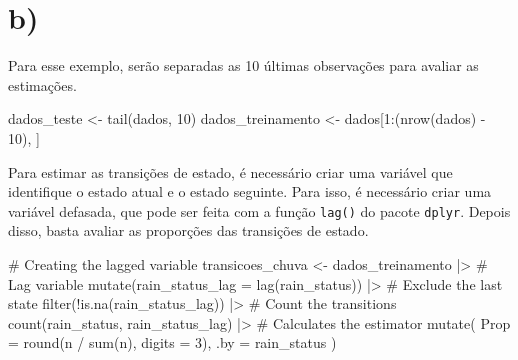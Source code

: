 \documentclass[
  letterpaper,
  DIV=11,
  numbers=noendperiod]{scrreprt}
\newenvironment{Shaded}{\begin{snugshade}}{\end{snugshade}}
\newcommand{\AttributeTok}[1]{\textcolor[rgb]{0.40,0.45,0.13}{#1}}
\newcommand{\CommentTok}[1]{\textcolor[rgb]{0.37,0.37,0.37}{#1}}
\newcommand{\DecValTok}[1]{\textcolor[rgb]{0.68,0.00,0.00}{#1}}
\newcommand{\FunctionTok}[1]{\textcolor[rgb]{0.28,0.35,0.67}{#1}}
\newcommand{\NormalTok}[1]{\textcolor[rgb]{0.00,0.23,0.31}{#1}}
\newcommand{\OtherTok}[1]{\textcolor[rgb]{0.00,0.23,0.31}{#1}}
\newcommand{\SpecialCharTok}[1]{\textcolor[rgb]{0.37,0.37,0.37}{#1}}
\begin{document}
\hypertarget{b}{%
\section*{b)}\label{b}}


Para esse exemplo, serão separadas as 10 últimas observações para
avaliar as estimações.

\begin{Shaded}
\begin{Highlighting}[]
\NormalTok{dados\_teste }\OtherTok{\textless{}{-}} \FunctionTok{tail}\NormalTok{(dados, }\DecValTok{10}\NormalTok{)}
\NormalTok{dados\_treinamento }\OtherTok{\textless{}{-}}\NormalTok{ dados[}\DecValTok{1}\SpecialCharTok{:}\NormalTok{(}\FunctionTok{nrow}\NormalTok{(dados) }\SpecialCharTok{{-}} \DecValTok{10}\NormalTok{), ]}
\end{Highlighting}
\end{Shaded}

Para estimar as transições de estado, é necessário criar uma variável
que identifique o estado atual e o estado seguinte. Para isso, é
necessário criar uma variável defasada, que pode ser feita com a função
\texttt{lag()} do pacote \texttt{dplyr}. Depois disso, basta avaliar as
proporções das transições de estado.

\begin{Shaded}
\begin{Highlighting}[]
\CommentTok{\# Creating the lagged variable}
\NormalTok{transicoes\_chuva }\OtherTok{\textless{}{-}}
\NormalTok{    dados\_treinamento }\SpecialCharTok{|\textgreater{}}
    \CommentTok{\# Lag variable}
    \FunctionTok{mutate}\NormalTok{(}\AttributeTok{rain\_status\_lag =} \FunctionTok{lag}\NormalTok{(rain\_status)) }\SpecialCharTok{|\textgreater{}}
    \CommentTok{\# Exclude the last state}
    \FunctionTok{filter}\NormalTok{(}\SpecialCharTok{!}\FunctionTok{is.na}\NormalTok{(rain\_status\_lag)) }\SpecialCharTok{|\textgreater{}}
    \CommentTok{\# Count the transitions}
    \FunctionTok{count}\NormalTok{(rain\_status, rain\_status\_lag) }\SpecialCharTok{|\textgreater{}}
    \CommentTok{\# Calculates the estimator}
    \FunctionTok{mutate}\NormalTok{(}
        \AttributeTok{Prop =} \FunctionTok{round}\NormalTok{(n }\SpecialCharTok{/} \FunctionTok{sum}\NormalTok{(n), }\AttributeTok{digits =} \DecValTok{3}\NormalTok{),}
        \AttributeTok{.by =}\NormalTok{ rain\_status}
\NormalTok{    )}
\end{Highlighting}
\end{Shaded}
\end{document}
